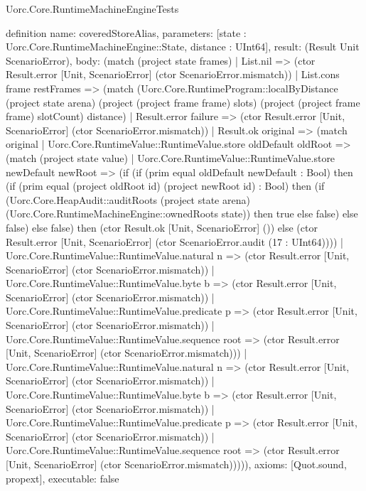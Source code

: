 \begin{lexlean}{Uorc.Core.RuntimeMachineEngineTests}
\begin{semanticmodule}
definition{
  name: coveredStoreAlias,
  parameters: [state : Uorc.Core.RuntimeMachineEngine::State, distance : UInt64],
  result: (Result Unit ScenarioError),
  body: (match (project state frames)
    | List.nil => (ctor Result.error [Unit, ScenarioError] (ctor ScenarioError.mismatch))
    | List.cons frame restFrames => (match (Uorc.Core.RuntimeProgram::localByDistance (project state arena) (project (project frame frame) slots) (project (project frame frame) slotCount) distance)
      | Result.error failure => (ctor Result.error [Unit, ScenarioError] (ctor ScenarioError.mismatch))
      | Result.ok original => (match original
        | Uorc.Core.RuntimeValue::RuntimeValue.store oldDefault oldRoot => (match (project state value)
          | Uorc.Core.RuntimeValue::RuntimeValue.store newDefault newRoot => (if (if (prim equal oldDefault newDefault : Bool) then (if (prim equal (project oldRoot id) (project newRoot id) : Bool) then (if (Uorc.Core.HeapAudit::auditRoots (project state arena) (Uorc.Core.RuntimeMachineEngine::ownedRoots state)) then true else false) else false) else false) then (ctor Result.ok [Unit, ScenarioError] ()) else (ctor Result.error [Unit, ScenarioError] (ctor ScenarioError.audit (17 : UInt64))))
          | Uorc.Core.RuntimeValue::RuntimeValue.natural n => (ctor Result.error [Unit, ScenarioError] (ctor ScenarioError.mismatch))
          | Uorc.Core.RuntimeValue::RuntimeValue.byte b => (ctor Result.error [Unit, ScenarioError] (ctor ScenarioError.mismatch))
          | Uorc.Core.RuntimeValue::RuntimeValue.predicate p => (ctor Result.error [Unit, ScenarioError] (ctor ScenarioError.mismatch))
          | Uorc.Core.RuntimeValue::RuntimeValue.sequence root => (ctor Result.error [Unit, ScenarioError] (ctor ScenarioError.mismatch)))
        | Uorc.Core.RuntimeValue::RuntimeValue.natural n => (ctor Result.error [Unit, ScenarioError] (ctor ScenarioError.mismatch))
        | Uorc.Core.RuntimeValue::RuntimeValue.byte b => (ctor Result.error [Unit, ScenarioError] (ctor ScenarioError.mismatch))
        | Uorc.Core.RuntimeValue::RuntimeValue.predicate p => (ctor Result.error [Unit, ScenarioError] (ctor ScenarioError.mismatch))
        | Uorc.Core.RuntimeValue::RuntimeValue.sequence root => (ctor Result.error [Unit, ScenarioError] (ctor ScenarioError.mismatch))))),
  axioms: [Quot.sound, propext],
  executable: false
}


\end{semanticmodule}
\end{lexlean}
